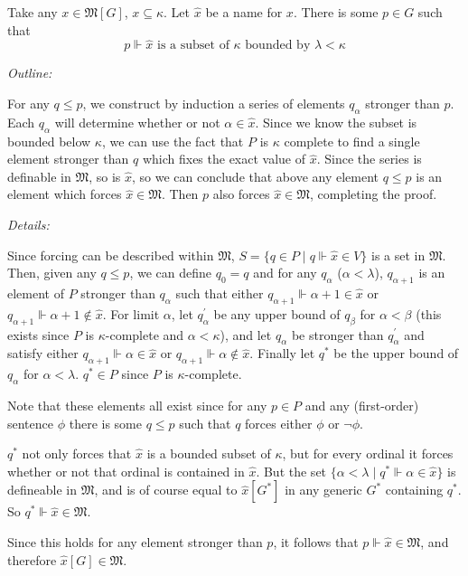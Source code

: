 \documentclass[12pt]{article}
\begin{document}
Take any $x\in\mathfrak{M}[G]$, $x\subseteq\kappa$.  Let $\hat{x}$ be a name for $x$.  There is some $p\in G$ such that 
$$p\Vdash\hat{x}\text{ is a subset of }\kappa\text{ bounded by }\lambda<\kappa$$

\emph{Outline:}

For any $q\leq p$, we construct by induction a series of elements $q_\alpha$ stronger than $p$.  Each $q_\alpha$ will determine whether or not $\alpha\in\hat{x}$.  Since we know the subset is bounded below $\kappa$, we can use the fact that $P$ is $\kappa$ complete to find a single element stronger than $q$ which fixes the exact value of $\hat{x}$.  Since the series is definable in $\mathfrak{M}$, so is $\hat{x}$, so we can conclude that above any element $q\leq p$ is an element which forces $\hat{x}\in\mathfrak{M}$.  Then $p$ also forces $\hat{x}\in\mathfrak{M}$, completing the proof.

\emph{Details:}

Since forcing can be described within $\mathfrak{M}$, $S=\{q\in P\mid q\Vdash \hat{x}\in V\}$ is a set in $\mathfrak{M}$.  Then, given any $q\leq p$, we can define $q_0=q$ and for any $q_\alpha$ ($\alpha<\lambda$), $q_{\alpha+1}$ is an element of $P$ stronger than $q_\alpha$ such that either $q_{\alpha+1}\Vdash\alpha+1\in \hat{x}$ or $q_{\alpha+1}\Vdash\alpha+1\notin \hat{x}$.  For limit $\alpha$, let $q_\alpha^\prime$ be any upper bound of $q_\beta$ for $\alpha<\beta$ (this exists since $P$ is $\kappa$-complete and $\alpha<\kappa$), and let $q_\alpha$ be stronger than $q_\alpha^\prime$ and satisfy either $q_{\alpha+1}\Vdash\alpha\in \hat{x}$ or $q_{\alpha+1}\Vdash\alpha\notin \hat{x}$.  Finally let $q^*$ be the upper bound of $q_\alpha$ for $\alpha<\lambda$.  $q^*\in P$ since $P$ is $\kappa$-complete.

Note that these elements all exist since for any $p\in P$ and any (first-order) sentence $\phi$ there is some $q\leq p$ such that $q$ forces either $\phi$ or $\neg\phi$.

$q^*$ not only forces that $\hat{x}$ is a bounded subset of $\kappa$, but for every ordinal it forces whether or not that ordinal is contained in $\hat{x}$.    But the set $\{\alpha<\lambda\mid q^*\Vdash \alpha\in\hat{x}\}$ is defineable in $\mathfrak{M}$, and is of course equal to $\hat{x}[G^*]$ in any generic $G^*$ containing $q^*$.  So $q^*\Vdash\hat{x}\in\mathfrak{M}$.

Since this holds for any element stronger than $p$, it follows that $p\Vdash\hat{x}\in\mathfrak{M}$, and therefore $\hat{x}[G]\in\mathfrak{M}$.
\end{document}
